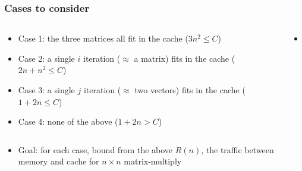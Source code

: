 \documentclass[12pt,dvipdfmx]{beamer}
\newcommand{\ao}[1]{{\color{blue}#1}}
\begin{document}
\begin{frame}[fragile]
\frametitle{Cases to consider}
\begin{columns}
  \begin{column}{0.5\textwidth}
    \begin{itemize}
    \item<2-> Case 1: the three matrices all fit in the cache ($3n^2 \leq C$)
    \item<3-> Case 2: a single $i$ iteration ($\approx$ \ao{a matrix}) fits in the cache
      ($2n+n^2 \leq C$)
    \item<4-> Case 3: a single $j$ iteration ($\approx$ \ao{two vectors}) fits in the cache
      ($1+2n \leq C$)
    \item<5-> Case 4: none of the above ($1+2n > C$)
    \end{itemize}
  \end{column}

  \begin{column}{0.5\textwidth}
    \begin{itemize}
    \item []
    \end{itemize}
  \end{column}
\end{columns}

\begin{itemize}
  \item[]
    Goal: for each case, bound from the above $R(n)$,
    the traffic between memory and cache for $n \times n$ matrix-multiply
\end{itemize}

\end{frame}
\end{document}
